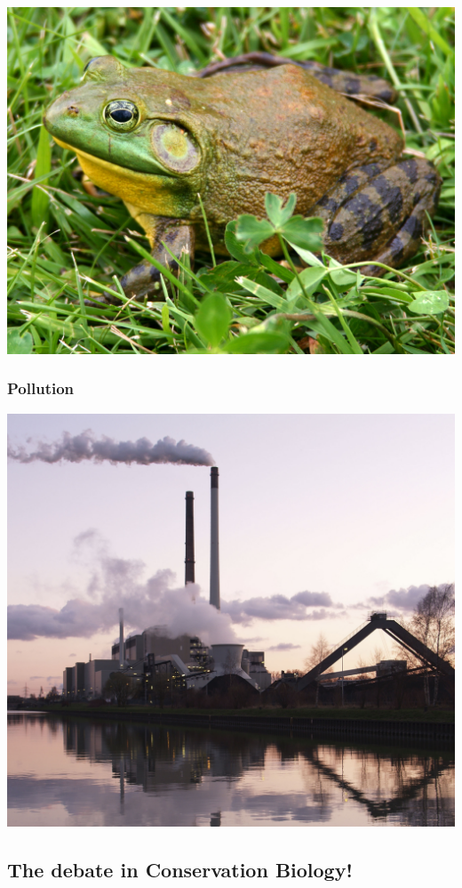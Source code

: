 \documentclass[
]{article}
\begin{document}
\includegraphics{bullfrog1.jpg}

\hypertarget{pollution}{%
\subsubsection{Pollution}\label{pollution}}

\includegraphics{pollution1.png}

\hypertarget{the-debate-in-conservation-biology}{%
\subsection{The debate in Conservation
Biology!}\label{the-debate-in-conservation-biology}}
\end{document}
